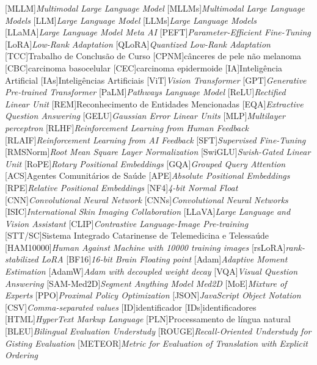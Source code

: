 [MLLM]{\textit{Multimodal Large Language Model}}
[MLLMs]{\textit{Multimodal Large Language Models}}
[LLM]{\textit{Large Language Model}}
[LLMs]{\textit{Large Language Models}}
[LLaMA]{\textit{Large Language Model Meta AI}}
[PEFT]{\textit{Parameter-Efficient Fine-Tuning}}
[LoRA]{\textit{Low-Rank Adaptation}}
[QLoRA]{\textit{Quantized Low-Rank Adaptation}}
[TCC]{Trabalho de Conclusão de Curso}
[CPNM]{cânceres de pele não melanoma}
[CBC]{carcinoma basocelular}
[CEC]{carcinoma epidermoide}
[IA]{Inteligência Artificial}
[IAs]{Inteligências Artificiais}
[ViT]{\textit{Vision Transformer}}
[GPT]{\textit{Generative Pre-trained Transformer}}
[PaLM]{\textit{Pathways Language Model}}
[ReLU]{\textit{Rectified Linear Unit}}
[REM]{Reconhecimento de Entidades Mencionadas}
[EQA]{\textit{Extractive Question Answering}}
[GELU]{\textit{Gaussian Error Linear Units}}
[MLP]{\textit{Multilayer perceptron}}
[RLHF]{\textit{Reinforcement Learning from Human Feedback}}
[RLAIF]{\textit{Reinforcement Learning from AI Feedback}}
[SFT]{\textit{Supervised Fine-Tuning}}
[RMSNorm]{\textit{Root Mean Square Layer Normalization}}
[SwiGLU]{\textit{Swish-Gated Linear Unit}}
[RoPE]{\textit{Rotary Positional Embeddings}}
[GQA]{\textit{Grouped Query Attention}}
[ACS]{Agentes Comunitários de Saúde}
[APE]{\textit{Absolute Positional Embeddings}}
[RPE]{\textit{Relative Positional Embeddings}}
[NF4]{\textit{4-bit Normal Float}}
[CNN]{\textit{Convolutional Neural Network}}
[CNNs]{\textit{Convolutional Neural Networks}}
[ISIC]{\textit{International Skin Imaging Collaboration}}
[LLaVA]{\textit{Large Language and Vision Assistant}}
[CLIP]{\textit{Contrastive Language-Image Pre-training}}
[STT/SC]{Sistema Integrado Catarinense de Telemedicina e Telessaúde}
[HAM10000]{\textit{Human Against Machine with 10000 training images}}
[rsLoRA]{\textit{rank-stabilized LoRA}}
[BF16]{\textit{16-bit Brain Floating point}}
[Adam]{\textit{Adaptive Moment Estimation}}
[AdamW]{\textit{Adam with decoupled weight decay}}
[VQA]{\textit{Visual Question Answering}}
[SAM-Med2D]{\textit{Segment Anything Model Med2D}}
[MoE]{\textit{Mixture of Experts}}
[PPO]{\textit{Proximal Policy Optimization}}
[JSON]{\textit{JavaScript Object Notation}}
[CSV]{\textit{Comma-separated values}}
[ID]{identificador}
[IDs]{identificadores}
[HTML]{\textit{HyperText Markup Language}}
[PLN]{Processamento de língua natural}
[BLEU]{\textit{Bilingual Evaluation Understudy}}
[ROUGE]{\textit{Recall-Oriented Understudy for Gisting Evaluation}}
[METEOR]{\textit{Metric for Evaluation of Translation with Explicit Ordering}}
